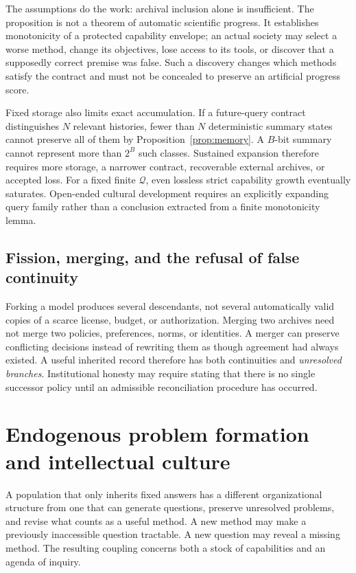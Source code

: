 \documentclass[11pt,letterpaper]{article}
\theoremstyle{plain}
\theoremstyle{definition}
\theoremstyle{remark}
\begin{document}
The assumptions do the work: archival inclusion alone is insufficient. The proposition is not a theorem of automatic scientific progress. It establishes monotonicity of a protected capability envelope; an actual society may select a worse method, change its objectives, lose access to its tools, or discover that a supposedly correct premise was false. Such a discovery changes which methods satisfy the contract and must not be concealed to preserve an artificial progress score.

Fixed storage also limits exact accumulation. If a future-query contract distinguishes $N$ relevant histories, fewer than $N$ deterministic summary states cannot preserve all of them by Proposition~\ref{prop:memory}. A $B$-bit summary cannot represent more than $2^B$ such classes. Sustained expansion therefore requires more storage, a narrower contract, recoverable external archives, or accepted loss. For a fixed finite $\mathcal Q$, even lossless strict capability growth eventually saturates. Open-ended cultural development requires an explicitly expanding query family rather than a conclusion extracted from a finite monotonicity lemma.

\subsection{Fission, merging, and the refusal of false continuity}

Forking a model produces several descendants, not several automatically valid copies of a scarce license, budget, or authorization. Merging two archives need not merge two policies, preferences, norms, or identities. A merger can preserve conflicting decisions instead of rewriting them as though agreement had always existed. A useful inherited record therefore has both continuities and \emph{unresolved branches}. Institutional honesty may require stating that there is no single successor policy until an admissible reconciliation procedure has occurred.


\section{Endogenous problem formation and intellectual culture}\label{sec:agendas}
A population that only inherits fixed answers has a different organizational structure from one that can generate questions, preserve unresolved problems, and revise what counts as a useful method. A new method may make a previously inaccessible question tractable. A new question may reveal a missing method. The resulting coupling concerns both a stock of capabilities and an agenda of inquiry.
\end{document}
